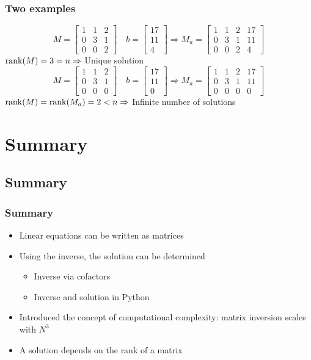 \begin{frame}[fragile]
  \frametitle{Two examples}
  \[
    M=
    \begin{bmatrix}
      1 & 1 & 2\\
      0 & 3 & 1\\
      0 & 0 & 2
    \end{bmatrix}\quad
    b=
    \begin{bmatrix}
      17\\11\\4
    \end{bmatrix}
    \Rightarrow
    M_a=
    \begin{bmatrix}
      1 & 1 & 2 & 17\\
      0 & 3 & 1 & 11\\
      0 & 0 & 2 & 4
    \end{bmatrix}
  \]
  $\operatorname{rank}(M)=3=n \Rightarrow $ Unique solution \pause \\ \vfill
    \[
    M=
    \begin{bmatrix}
      1 & 1 & 2\\
      0 & 3 & 1\\
      0 & 0 & 0
    \end{bmatrix}\quad
    b=
    \begin{bmatrix}
      17\\11\\0
    \end{bmatrix}
    \Rightarrow
    M_a=
    \begin{bmatrix}
      1 & 1 & 2 & 17\\
      0 & 3 & 1 & 11\\
      0 & 0 & 0 & 0
    \end{bmatrix}
  \]
  $\operatorname{rank}(M)=\operatorname{rank}(M_a)=2<n \Rightarrow $ Infinite number of solutions
\end{frame} 

\section{Summary}
\subsection*{Summary}

\begin{frame}[fragile]
  \frametitle{Summary}
  \begin{itemize}
    \item Linear equations can be written as matrices
    \item Using the inverse, the solution can be determined
    \begin{itemize}
      \item Inverse via cofactors
      \item Inverse and solution in Python
    \end{itemize}
    \item Introduced the concept of computational complexity: matrix inversion scales with $N^3$
    \item A solution depends on the rank of a matrix
  \end{itemize}
\end{frame}